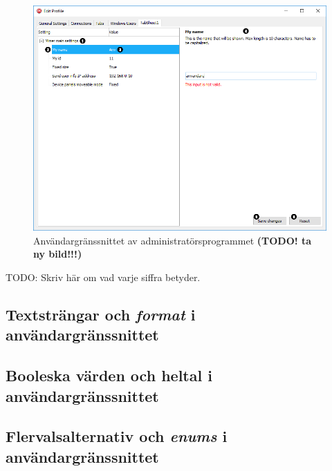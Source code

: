 \begin{figure}
	\includegraphics[width=\textwidth]{./images/gui/helhet-copy.png}
	\caption{Användargränssnittet av administratörsprogrammet \textbf{(TODO! ta ny bild!!!)}}
	\label{fig:gui:helhet}
\end{figure}

TODO: Skriv här om vad varje siffra betyder.

\FloatBarrier
\subsection{Textsträngar och \textit{format} i användargränssnittet}


\subsection{Booleska värden och heltal i användargränssnittet}


\subsection{Flervalsalternativ och \textit{enums} i användargränssnittet}
\label{sec:arbetet:gui:enums}


